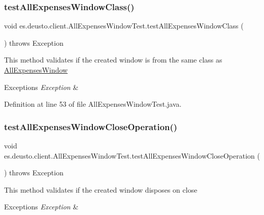 \subsubsection{\texorpdfstring{test\+All\+Expenses\+Window\+Class()}{testAllExpensesWindowClass()}}
{\footnotesize\ttfamily void es.\+deusto.\+client.\+All\+Expenses\+Window\+Test.\+test\+All\+Expenses\+Window\+Class (\begin{DoxyParamCaption}{ }\end{DoxyParamCaption}) throws Exception}

This method validates if the created window is from the same class as \hyperlink{classes_1_1deusto_1_1client_1_1_all_expenses_window}{All\+Expenses\+Window} 
\begin{DoxyExceptions}{Exceptions}
{\em Exception} & \\
\hline
\end{DoxyExceptions}


Definition at line 53 of file All\+Expenses\+Window\+Test.\+java.

\mbox{\label{classes_1_1deusto_1_1client_1_1_all_expenses_window_test_a049027a256d872c1999c6bf5f3032c4d}} 
\subsubsection{\texorpdfstring{test\+All\+Expenses\+Window\+Close\+Operation()}{testAllExpensesWindowCloseOperation()}}
{\footnotesize\ttfamily void es.\+deusto.\+client.\+All\+Expenses\+Window\+Test.\+test\+All\+Expenses\+Window\+Close\+Operation (\begin{DoxyParamCaption}{ }\end{DoxyParamCaption}) throws Exception}

This method validates if the created window disposes on close 
\begin{DoxyExceptions}{Exceptions}
{\em Exception} & \\
\hline
\end{DoxyExceptions}


